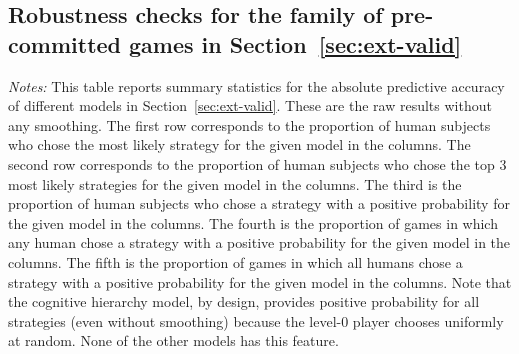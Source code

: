 \documentclass[11pt]{article}
\theoremstyle{definition}
\begin{document}
\newpage \clearpage

\subsection{Robustness checks for the family of pre-committed games in Section~\ref{sec:ext-valid}}
\label{app:robustness_checks}

\begin{table}[h!]
\begin{center}
\caption{Summary statistics for absolute predictive accuracy of different models ($\varepsilon = 0$).} 
\label{tab:match_rates}
\footnotesize
\renewcommand{\arraystretch}{1.25}

\end{center}
\begin{footnotesize}
\begin{singlespace}
\vspace*{-0.05in}
\emph{Notes:} This table reports summary statistics for the absolute predictive accuracy of different models in Section~\ref{sec:ext-valid}.
These are the raw results without any smoothing.
The first row corresponds to the proportion of human subjects who chose the most likely strategy for the given model in the columns.
The second row corresponds to the proportion of human subjects who chose the top 3 most likely strategies for the given model in the columns.
The third is the proportion of human subjects who chose a strategy with a positive probability for the given model in the columns.
The fourth is the proportion of games in which any human chose a strategy with a positive probability for the given model in the columns.
The fifth is the proportion of games in which all humans chose a strategy with a positive probability for the given model in the columns.
Note that the cognitive hierarchy model, by design, provides positive probability for all strategies (even without smoothing) because the level-$0$ player chooses uniformly at random.
None of the other models has this feature.
\end{singlespace}
\end{footnotesize}
\end{table}
  
\end{document}
